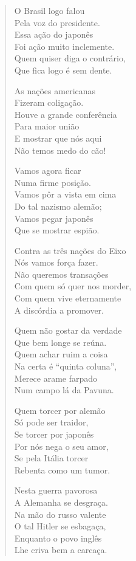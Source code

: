 \begin{verse}
O Brasil logo falou \\
Pela voz do presidente.\\
Essa ação do japonês\\
Foi ação muito inclemente.\\
Quem quiser diga o contrário,\\
Que fica logo é sem dente.

As nações americanas\\
Fizeram coligação.\\
Houve a grande conferência\\
Para maior união\\
E mostrar que nós aqui\\
Não temos medo do cão!


Vamos agora ficar\\
Numa firme posição.\\
Vamos pôr a vista em cima\\
Do tal nazismo alemão;\\
Vamos pegar japonês\\
Que se mostrar espião.

Contra as três nações do Eixo\\
Nós vamos força fazer.\\
Não queremos transações\\
Com quem só quer nos morder,\\
Com quem vive eternamente\\
A discórdia a promover.

Quem não gostar da verdade\\
Que bem longe se reúna.\\
Quem achar ruim a coisa\\
Na certa é “quinta coluna”,\\
Merece arame farpado\\
Num campo lá da Pavuna.

Quem torcer por alemão\\
Só pode ser traidor,\\
Se torcer por japonês\\
Por nós nega o seu amor,\\
Se pela Itália torcer\\
Rebenta como um tumor.


Nesta guerra pavorosa\\
A Alemanha se desgraça.\\
Na mão do russo valente\\
O tal Hitler se esbagaça,\\
Enquanto o povo inglês\\
Lhe criva bem a carcaça.


\end{verse}
